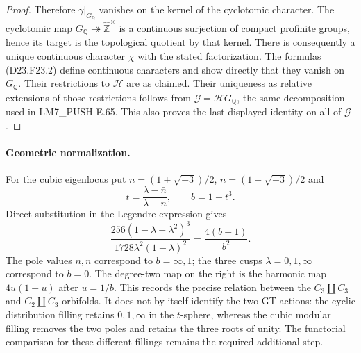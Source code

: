 \begin{proof}
Therefore $\gamma|_{G_{\mathbb Q}}$ vanishes on the kernel of
the cyclotomic character. The cyclotomic map
$G_{\mathbb Q}\twoheadrightarrow\widehat{\mathbb Z}^{\times}$
is a continuous surjection of compact profinite groups, hence
its target is the topological quotient by that kernel.
There is consequently a unique continuous character $\chi$
with the stated factorization. The formulas (D23.F23.2) define
continuous characters and show directly that they vanish on
$G_{\mathbb Q}$. Their restrictions to $\mathcal H$ are as
claimed. Their uniqueness as relative extensions of those
restrictions follows from
$\mathcal G=\mathcal H G_{\mathbb Q}$, the same decomposition
used in \textup{LM7\_PUSH E.65}. This also proves the last
displayed identity on all of $\mathcal G$.
\end{proof}

\paragraph{Geometric normalization.}
For the cubic eigenlocus put
$n=(1+\sqrt{-3})/2$, $\bar n=(1-\sqrt{-3})/2$ and
\[
 t=\frac{\lambda-\bar n}{\lambda-n},\qquad b=1-t^3.
\]
Direct substitution in the Legendre expression gives
\[
 \frac{256(1-\lambda+\lambda^2)^3}
      {1728\lambda^2(1-\lambda)^2}
       =\frac{4(b-1)}{b^2}.                                \tag{D23.F23.5}
\]
The pole values $n,\bar n$ correspond to $b=\infty,1$;
the three cusps $\lambda=0,1,\infty$ correspond to $b=0$.
The degree-two map on the right is the harmonic map
$4u(1-u)$ after $u=1/b$. This records the precise relation
between the $C_3\amalg C_3$ and $C_2\amalg C_3$ orbifolds.
It does not by itself identify the two GT actions: the cyclic
distribution filling retains $0,1,\infty$ in the $t$-sphere,
whereas the cubic modular filling removes the two poles and
retains the three roots of unity. The functorial comparison for
these different fillings remains the required additional step.
